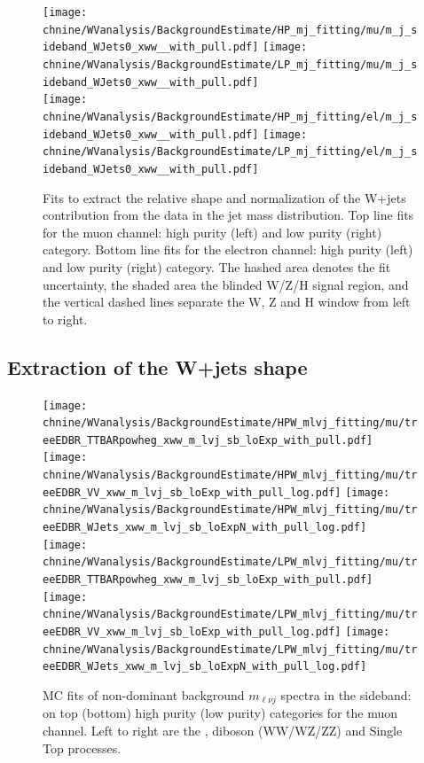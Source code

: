 \begin{figure}[htbp]
\centering
\texttt{[image: \\chnine/WVanalysis/BackgroundEstimate/HP\_mj\_fitting/mu/m\_j\_sideband\_WJets0\_xww\_\_with\_pull.pdf]}
\texttt{[image: \\chnine/WVanalysis/BackgroundEstimate/LP\_mj\_fitting/mu/m\_j\_sideband\_WJets0\_xww\_\_with\_pull.pdf]}\\
\texttt{[image: \\chnine/WVanalysis/BackgroundEstimate/HP\_mj\_fitting/el/m\_j\_sideband\_WJets0\_xww\_\_with\_pull.pdf]}
\texttt{[image: \\chnine/WVanalysis/BackgroundEstimate/LP\_mj\_fitting/el/m\_j\_sideband\_WJets0\_xww\_\_with\_pull.pdf]}\\
\caption{Fits to extract the relative shape and normalization of the W+jets contribution from
the data in the jet mass distribution. Top line fits for the muon channel: high purity (left) and low purity (right) category. Bottom line fits for
the electron channel: high purity (left) and low purity (right) category. The hashed area denotes the fit uncertainty, the shaded area the blinded W/Z/H signal region, and the vertical dashed lines separate the W, Z and H window from left to right.}
\label{fig:mjFits_data}
\end{figure}

 \subsection{Extraction of the W+jets shape}
 

\begin{figure}[htbp]
\centering
\texttt{[image: \\chnine/WVanalysis/BackgroundEstimate/HPW\_mlvj\_fitting/mu/treeEDBR\_TTBARpowheg\_xww\_m\_lvj\_sb\_loExp\_with\_pull.pdf]}
\texttt{[image: \\chnine/WVanalysis/BackgroundEstimate/HPW\_mlvj\_fitting/mu/treeEDBR\_VV\_xww\_m\_lvj\_sb\_loExp\_with\_pull\_log.pdf]}
\texttt{[image: \\chnine/WVanalysis/BackgroundEstimate/HPW\_mlvj\_fitting/mu/treeEDBR\_WJets\_xww\_m\_lvj\_sb\_loExpN\_with\_pull\_log.pdf]}\\
\texttt{[image: \\chnine/WVanalysis/BackgroundEstimate/LPW\_mlvj\_fitting/mu/treeEDBR\_TTBARpowheg\_xww\_m\_lvj\_sb\_loExp\_with\_pull.pdf]}
\texttt{[image: \\chnine/WVanalysis/BackgroundEstimate/LPW\_mlvj\_fitting/mu/treeEDBR\_VV\_xww\_m\_lvj\_sb\_loExp\_with\_pull\_log.pdf]}
\texttt{[image: \\chnine/WVanalysis/BackgroundEstimate/LPW\_mlvj\_fitting/mu/treeEDBR\_WJets\_xww\_m\_lvj\_sb\_loExpN\_with\_pull\_log.pdf]}\\
\caption{MC fits of non-dominant background $m_{\ell\nu j}$ spectra in the \mJ sideband: on top (bottom) high purity (low purity) categories
for the muon channel. Left to right are the \ttbar, diboson (WW/WZ/ZZ) and Single Top processes.}
\label{fig:sbfitmlvj_1}
\end{figure}

